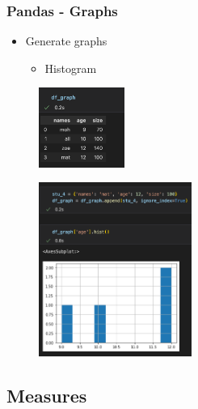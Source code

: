 \begin{frame}\frametitle{Pandas - Graphs}
   \begin{minipage}{0.58\linewidth}
      \begin{itemize}
         \item Generate graphs
         \begin{itemize}
            \item Histogram
         \end{itemize}
      \end{itemize}
      \vspace{.5cm}
      \begin{figure}[H]
         \includegraphics[width=2.8cm]{../images/illustrations/pandas_df_graph.png}
      \end{figure}
   \end{minipage}
   \begin{minipage}{0.38\linewidth}
      \begin{figure}[H]
         \includegraphics[width=5cm]{../images/illustrations/pandas_hist.png}
      \end{figure}
   \end{minipage}
\end{frame}


\subsection{Measures}

